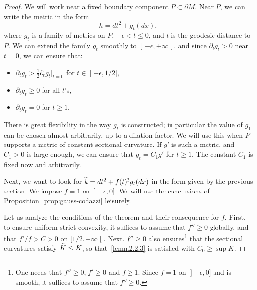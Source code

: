 \documentclass[AHL,Unicode,longabstracts,published]{cedram}
\theoremstyle{plain}
\let\oldtilde\tilde
\renewcommand*{\tilde}[1]{\mathchoice{\widetilde{#1}}{\widetilde{#1}}{\oldtilde{#1}}{\oldtilde{#1}}}
\begin{document}
\begin{proof}
We will work near a fixed boundary component $P\subset \partial M$. Near $P$, we can write the metric in the form
\[
h=dt^2 + g_t(dx),
\]
where $g_t$ is a family of metrics on $P$, $-\epsilon< t\leq 0$, and $t$ is the geodesic distance to $P$. We can extend the family $g_t$ smoothly to $\mathopen{]}-\epsilon, +\infty\mathclose{[}$, and since $\partial_t g_t > 0$ near $ t = 0$, we can ensure that:
\begin{itemize}
\item $\partial_t g_t > \tfrac{1}{2}\partial_t g_t|_{t=0}$ for $t\in\mathopen{]}-\epsilon, 1/2]$,
\item $\partial_t g_t \geq 0$ for all $t$'s,
\item $\partial_t g_t = 0$ for $t\geq 1$.
\end{itemize}
There is great flexibility in the way $g_t$ is constructed; in particular the value of $g_1$ can be chosen almost arbitrarily, up to a dilation factor. We will use this when $P$ supports a metric of constant sectional curvature. If $g'$ is such a metric, and $C_1>0$ is large enough, we can ensure that $g_t = C_1 g'$ for $t\geq 1$. The constant $C_1$ is fixed now and arbitrarily.

Next, we want to look for $\tilde{h} = dt^2 +f(t)^2 g_t(dx)$ in the form given by the previous section. We impose $f=1$ on $\mathopen{]}-\epsilon, 0]$. We will use the conclusions of Proposition~\ref{prop:gauss-codazzi} leisurely.

Let us analyze the conditions of the theorem and their consequence for $f$. First, to ensure uniform strict convexity, it suffices to assume that $f''\geq 0$ globally, and that $f'/f>C>0$ on $[1/2, +\infty\mathclose{[}$. Next, $f''\geq 0$ also ensures\footnote{One needs that $f''\geq 0$, $f'\geq 0$ and $f\geq 1$. Since $f=1$ on $\mathopen{]}-\epsilon, 0]$ and is smooth, it suffices to assume that $f''\geq 0$.} that the sectional curvatures satisfy $\tilde{K}\leq K$, so that~\eqref{lemm2.2.3} is satisfied with $C_0 \geq \sup K$.


\end{proof}
\end{document}
